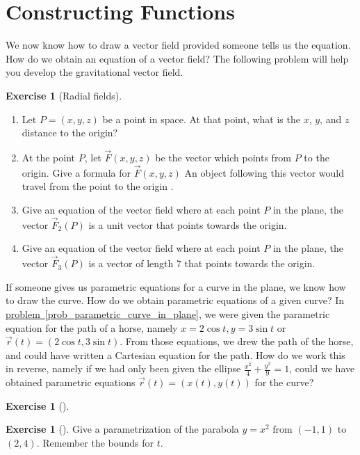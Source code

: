 \documentclass[10pt,]{book}
\theoremstyle{plain}
\theoremstyle{definition}
\theoremstyle{definition}
\theoremstyle{definition}
\theoremstyle{definition}
\newtheorem{exploration}[project]{Exercise}
\theoremstyle{definition}
\numberwithin{equation}{section}
\newcommand{\ds}{\displaystyle}
\begin{document}
\section[{Constructing Functions}]{Constructing Functions}\label{section-19}
We now know how to draw a vector field provided someone tells us the equation. How do we obtain an equation of a vector field? The following problem will help you develop the gravitational vector field.%
\begin{exploration}[Radial fields]\label{exploration-120}
\leavevmode%
\begin{enumerate}[font=\bfseries,label=(\alph*),ref=\alph*]
\item\label{task-243} Let \(P=(x,y,z)\) be a point in space. At that point, what is the \(x\), \(y\), and \(z\) distance to the origin?%
\item\label{task-244} At the point \(P\), let \(\vec F(x,y,z)\) be the vector which points from \(P\) to the origin.  Give a formula for \(\vec F(x,y,z)\) An object following this vector would travel from the point to the origin%
 .%
\item\label{task-245} Give an equation of the vector field where at each point \(P\) in the plane, the vector \(\vec F_2(P)\) is a unit vector that points towards the origin.%
\item\label{task-246} Give an equation of the vector field where at each point \(P\) in the plane, the vector \(\vec F_3(P)\) is a vector of length 7 that points towards the origin.%
\end{enumerate}
\end{exploration}
If someone gives us parametric equations for a curve in the plane, we know how to draw the curve. How do we obtain parametric equations of a given curve? In \hyperref[prob_parametric_curve_in_plane]{problem~\ref{prob_parametric_curve_in_plane}}, we were given the parametric equation for the path of a horse, namely \(x=2\cos t, y=3 \sin t\) or \(\vec r(t)=(2\cos t,3\sin t)\). From those equations, we drew the path of the horse, and could have written a Cartesian equation for the path. How do we work this in reverse, namely if we had only been given the ellipse \(\ds\frac{x^2}{4}+\frac{y^2}{9}=1\), could we have obtained parametric equations \(\vec r(t)=(x(t),y(t))\) for the curve?%
\begin{exploration}[]\label{exploration-121}
\end{exploration}
\begin{exploration}[]\label{exploration-122}
Give a parametrization of the parabola \(y=x^2\) from \((-1,1)\) to \((2,4)\). Remember the bounds for \(t\).%
\end{exploration}
\end{document}
